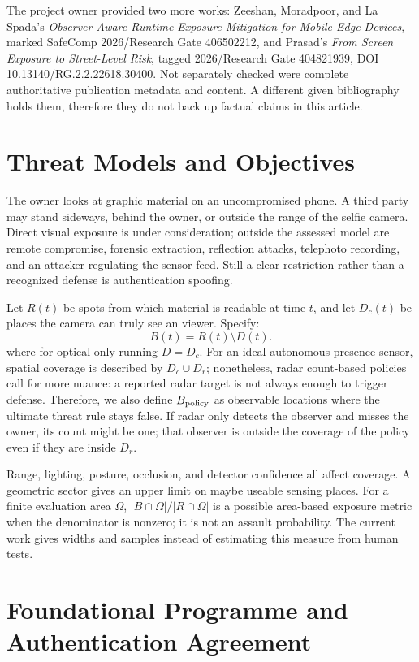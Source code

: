 \documentclass[conference]{IEEEtran}
\begin{document}
The project owner provided two more works: Zeeshan, Moradpoor, and La Spada's \emph{Observer-Aware Runtime Exposure Mitigation for Mobile Edge Devices}, marked SafeComp 2026/Research Gate 406502212, and Prasad's \emph{From Screen Exposure to Street-Level Risk}, tagged 2026/Research Gate 404821939, DOI 10.13140/RG.2.2.22618.30400. Not separately checked were complete authoritative publication metadata and content. A different given bibliography holds them, therefore they do not back up factual claims in this article.

\section{Threat Models and Objectives}
The owner looks at graphic material on an uncompromised phone. A third party may stand sideways, behind the owner, or outside the range of the selfie camera. Direct visual exposure is under consideration; outside the assessed model are remote compromise, forensic extraction, reflection attacks, telephoto recording, and an attacker regulating the sensor feed. Still a clear restriction rather than a recognized defense is authentication spoofing.

Let $R(t)$ be spots from which material is readable at time $t$, and let $D_c(t)$ be places the camera can truly see an viewer. Specify:
\begin{equation}
 B(t)=R(t)\setminus D(t).
 \label{eq:blind}
\end{equation}
where for optical-only running $D=D_c$. For an ideal autonomous presence sensor, spatial coverage is described by $D_c\cup D_r$; nonetheless, radar count-based policies call for more nuance: a reported radar target is not always enough to trigger defense. Therefore, we also define $B_{\rm policy}$ as observable locations where the ultimate threat rule stays false. If radar only detects the observer and misses the owner, its count might be one; that observer is outside the coverage of the policy even if they are inside $D_r$.

Range, lighting, posture, occlusion, and detector confidence all affect coverage. A geometric sector gives an upper limit on maybe useable sensing places. For a finite evaluation area $\Omega$, $|B\cap\Omega|/|R\cap\Omega|$ is a possible area-based exposure metric when the denominator is nonzero; it is not an assault probability. The current work gives widths and samples instead of estimating this measure from human tests.

\section{Foundational Programme and Authentication Agreement}
\end{document}
